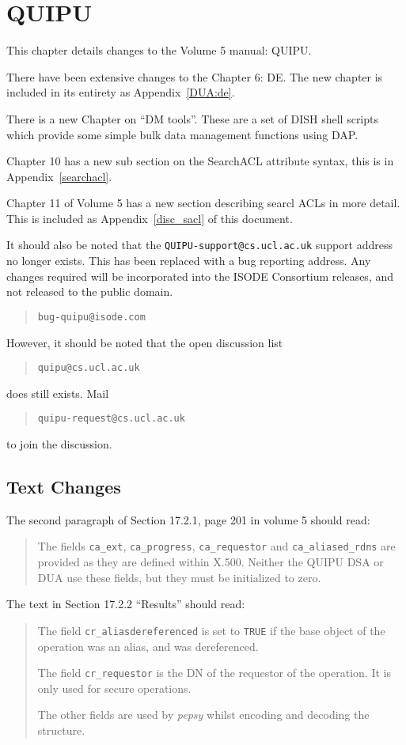 \chapter{QUIPU}

This chapter details changes to the Volume 5 manual: QUIPU.

There have been extensive changes to the Chapter 6: DE.  The new
chapter is included in its entirety as Appendix~\ref{DUA:de}.

There is a new Chapter on ``DM tools''.  These are a set of DISH shell
scripts which provide some simple bulk data management functions using
DAP.

Chapter 10 has a new sub section on the SearchACL attribute syntax, 
this is in Appendix~\ref{searchacl}.

Chapter 11 of Volume 5 has a new section describing searcl ACLs in
more detail.  This is included as Appendix~\ref{disc_sacl} of this document.
  
It should also be noted that the {\tt QUIPU-support@cs.ucl.ac.uk} support
address no longer exists.  This has been replaced with a bug reporting
address.  Any changes required will be incorporated into the ISODE Consortium
releases, and not released to the public domain.  

\begin{quote}
{\tt bug-quipu@isode.com\/}
\end{quote}
However, it should be noted that the open discussion list 
\begin{quote}
{\tt quipu@cs.ucl.ac.uk\/}
\end{quote}
does still exists.  Mail 
\begin{quote}
{\tt quipu-request@cs.ucl.ac.uk\/}
\end{quote}
to join the discussion.

\section{Text Changes}

The second paragraph of Section 17.2.1, page 201 in volume 5 should read:
\begin{quote}
The fields \verb"ca_ext", \verb"ca_progress", \verb"ca_requestor" 
and \verb"ca_aliased_rdns" are provided as
they are defined within X.500.  Neither the QUIPU DSA or DUA use these
fields, but they must be initialized to zero.
\end{quote}
  
The text in Section 17.2.2 ``Results'' should read:
\begin{quote}
The field \verb"cr_aliasdereferenced" is set to \verb"TRUE" if the base
object of the operation was an alias, and was dereferenced.

The field \verb"cr_requestor" is the DN of the requestor of the
operation.  It is only used for secure operations.

The other fields are used by {\em pepsy} whilst encoding and decoding
the structure.
\end{quote}

